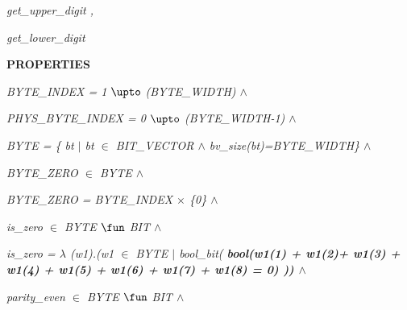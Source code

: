 \hspace*{0.20in}\it get\_upper\_digit \rm ,

\hspace*{0.20in}\it get\_lower\_digit 

\hspace*{0.20in}

\bf PROPERTIES

\hspace*{0.20in}

\hspace*{0.20in}\it BYTE\_INDEX \rm = \rm 1 $\upto$  \rm (\it BYTE\_WIDTH\rm )  $\land$ 

\hspace*{0.20in}\it PHYS\_BYTE\_INDEX \rm = \rm 0 $\upto$ \rm (\it BYTE\_WIDTH\rm -\rm 1\rm )\hspace*{0.10in} $\land$ 

\hspace*{0.20in}\it BYTE \rm = \rm \{ \it bt  $\mid$  \it bt $\in$ \it BIT\_VECTOR  $\land$  \it bv\_size\rm (\it bt\rm )\rm =\it BYTE\_WIDTH\rm \}\hspace*{0.10in} $\land$ 

\hspace*{0.20in}\it BYTE\_ZERO  $\in$  \it BYTE  $\land$ 

\hspace*{0.20in}\it BYTE\_ZERO \rm = \it BYTE\_INDEX  $\times$  \rm \{\rm 0\rm \}  $\land$ 

\hspace*{0.20in}

\hspace*{0.20in}

\hspace*{0.20in}\it is\_zero  $\in$  \it BYTE  $\fun$  \it BIT  $\land$ 

\hspace*{0.20in}\it is\_zero \rm =  $\lambda$ \rm (\it w1\rm )\rm .\rm (\it w1  $\in$  \it BYTE  $\mid$  \it bool\_bit\rm ( \bf bool\rm (\it w1\rm (\rm 1\rm ) \rm + \it w1\rm (\rm 2\rm )\rm + \it w1\rm (\rm 3\rm ) \rm + \it w1\rm (\rm 4\rm ) \rm + \it w1\rm (\rm 5\rm ) \rm + \it w1\rm (\rm 6\rm ) \rm + \it w1\rm (\rm 7\rm ) \rm + \it w1\rm (\rm 8\rm ) \rm = \rm 0\rm ) \rm )\rm )  $\land$ 

\vspace*{4mm}
\hspace*{0.20in}

\hspace*{0.20in}\it parity\_even  $\in$  \it BYTE  $\fun$  \it BIT\hspace*{0.20in} $\land$ 


